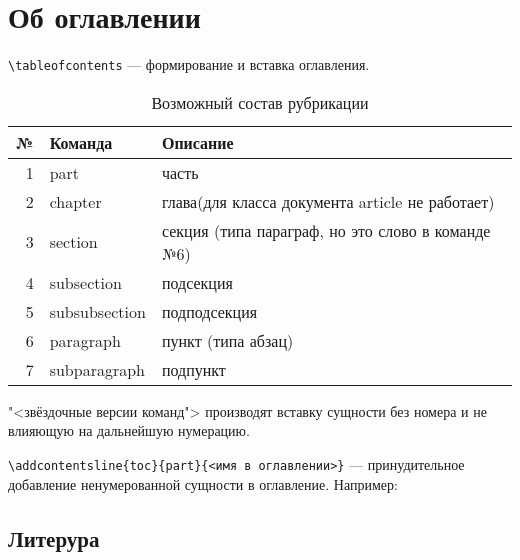 \section{Об оглавлении}

\noindent
{}

\bigskip

\noindent
\verb|\tableofcontents| --- формирование и вставка оглавления.

\begin{table}[h]
    \caption{Возможный состав рубрикации}
    \label{sectioning}
    \begin{tabular}{|r|l|p{}|}
        \hline
        \textbf{№}        &
        \textbf{Команда}  &
        \textbf{Описание}                                              \\ \hline
        1 & part          & часть                                      \\ \hline
        2 & chapter       & глава(для класса документа article не
                            работает)                                  \\ \hline
        3 & section       & секция (типа параграф, но это слово в
                            команде №6)                                \\ \hline
        4 & subsection    & подсекция                                  \\ \hline
        5 & subsubsection & подподсекция                               \\ \hline
        6 & paragraph     & пункт (типа абзац)                         \\ \hline
        7 & subparagraph  & подпункт                                   \\ \hline
    \end{tabular}
\end{table}

\noindent
"<звёздочные версии команд"> производят вставку сущности без номера и не влияющую на дальнейшую нумерацию.

\bigskip

\noindent
\verb|\addcontentsline{toc}{part}{<имя в оглавлении>}| --- принудительное добавление ненумерованной сущности в оглавление. Например:

\medskip

\noindent
\begin{boxedverbatim}
\section*{Литерура}
\end{boxedverbatim}

\clearpage